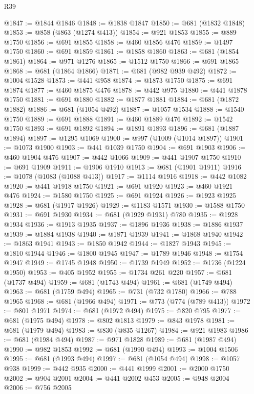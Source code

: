 \begin{lexlean}{R39}
\begin{coremodule}
@1847 := @1844 @1846
@1848 := @1838 @1847
@1850 := @681 (@1832 @1848)
@1853 := @858 (@863 (@1274 @413))
@1854 := @921 @1853
@1855 := @889 @1750
@1856 := @691 @1855
@1858 := @460 @1856 @476
@1859 := @1497 @1750
@1860 := @691 @1859
@1861 := @1858 @1860
@1863 := @681 (@1854 @1861)
@1864 := @971 @1276
@1865 := @1512 @1750
@1866 := @691 @1865
@1868 := @681 (@1864 @1866)
@1871 := @681 (@982 @939 @492)
@1872 := @1004 @1528
@1873 := @441 @958
@1874 := @1873 @1750
@1875 := @691 @1874
@1877 := @460 @1875 @476
@1878 := @442 @975
@1880 := @441 @1878 @1750
@1881 := @691 @1880
@1882 := @1877 @1881
@1884 := @681 (@1872 @1882)
@1886 := @681 (@1054 @492)
@1887 := @1057 @1534
@1888 := @1540 @1750
@1889 := @691 @1888
@1891 := @460 @1889 @476
@1892 := @1542 @1750
@1893 := @691 @1892
@1894 := @1891 @1893
@1896 := @681 (@1887 @1894)
@1897 := @1295 @1069
@1900 := @997 (@1009 (@1014 @1897))
@1901 := @1073 @1900
@1903 := @441 @1039 @1750
@1904 := @691 @1903
@1906 := @460 @1904 @476
@1907 := @442 @1066
@1909 := @441 @1907 @1750
@1910 := @691 @1909
@1911 := @1906 @1910
@1913 := @681 (@1901 @1911)
@1916 := @1078 (@1083 (@1088 @413))
@1917 := @1114 @1916
@1918 := @442 @1082
@1920 := @441 @1918 @1750
@1921 := @691 @1920
@1923 := @460 @1921 @476
@1924 := @1580 @1750
@1925 := @691 @1924
@1926 := @1923 @1925
@1928 := @681 (@1917 @1926)
@1929 := @1183 @1571
@1930 := @1588 @1750
@1931 := @691 @1930
@1934 := @681 (@1929 @1931) @780
@1935 := @1928 @1934
@1936 := @1913 @1935
@1937 := @1896 @1936
@1938 := @1886 @1937
@1939 := @1884 @1938
@1940 := @1871 @1939
@1941 := @1868 @1940
@1942 := @1863 @1941
@1943 := @1850 @1942
@1944 := @1827 @1943
@1945 := @1810 @1944
@1946 := @1800 @1945
@1947 := @1789 @1946
@1948 := @1754 @1947
@1949 := @1745 @1948
@1950 := @1739 @1949
@1952 := @1736 (@1224 @1950)
@1953 := @405 @1952
@1955 := @1734 @261 @220
@1957 := @681 (@1737 @494)
@1959 := @681 (@1743 @494)
@1961 := @681 (@1749 @494)
@1963 := @681 (@1759 @494)
@1965 := @731 (@732 @1780)
@1966 := @788 @1965
@1968 := @681 (@1966 @494)
@1971 := @773 (@774 (@789 @413))
@1972 := @801 @1971
@1974 := @681 (@1972 @494)
@1975 := @820 @795
@1977 := @681 (@1975 @494)
@1978 := @802 @1813
@1979 := @843 @1978
@1981 := @681 (@1979 @494)
@1983 := @830 (@835 @1267)
@1984 := @921 @1983
@1986 := @681 (@1984 @494)
@1987 := @971 @1828
@1989 := @681 (@1987 @494)
@1990 := @982 @1853
@1992 := @681 (@1990 @494)
@1993 := @1004 @1506
@1995 := @681 (@1993 @494)
@1997 := @681 (@1054 @494)
@1998 := @1057 @938
@1999 := @442 @935
@2000 := @441 @1999
@2001 := @2000 @1750
@2002 := @904 @2001
@2004 := @441 @2002 @453
@2005 := @948 @2004
@2006 := @756 @2005

\end{coremodule}
\end{lexlean}
